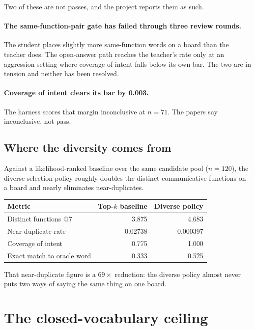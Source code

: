 \documentclass[11pt,a4paper]{article}
\begin{document}
Two of these are not passes, and the project reports them as such.

\paragraph{The same-function-pair gate has failed through three review rounds.} The
student places slightly more same-function words on a board than the teacher does. The
open-answer path reaches the teacher's rate only at an aggression setting where coverage
of intent falls below its own bar. The two are in tension and neither has been resolved.

\paragraph{Coverage of intent clears its bar by 0.003.} The harness scores that margin
inconclusive at $n=71$. The papers say inconclusive, not pass.

\subsection{Where the diversity comes from}

Against a likelihood-ranked baseline over the same candidate pool ($n=120$), the diverse
selection policy roughly doubles the distinct communicative functions on a board and
nearly eliminates near-duplicates.

\begin{center}
\begin{tabular}{@{}lrr@{}}
\toprule
\textbf{Metric} & \textbf{Top-$k$ baseline} & \textbf{Diverse policy} \\
\midrule
Distinct functions @7        & 3.875   & 4.683 \\
Near-duplicate rate          & 0.02738 & 0.000397 \\
Coverage of intent           & 0.775   & 1.000 \\
Exact match to oracle word   & 0.333   & 0.525 \\
\bottomrule
\end{tabular}
\end{center}

\noindent That near-duplicate figure is a $69\times$ reduction: the diverse policy almost
never puts two ways of saying the same thing on one board.

\section{The closed-vocabulary ceiling}
\label{sec:ceiling}
\end{document}
